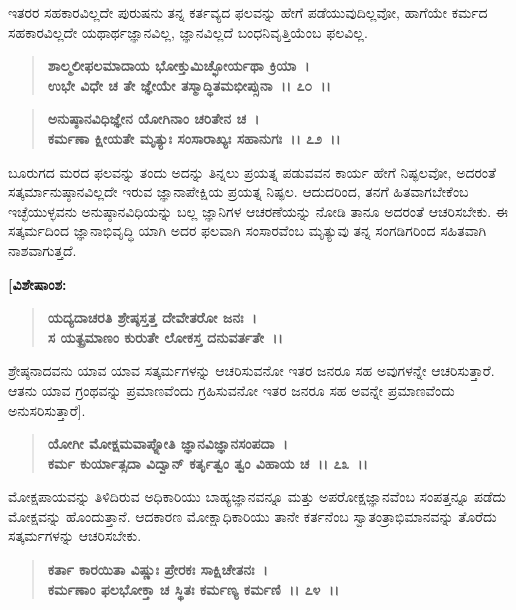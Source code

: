 ಇತರರ ಸಹಕಾರವಿಲ್ಲದೇ ಪುರುಷನು ತನ್ನ ಕರ್ತವ್ಯದ ಫಲವನ್ನು ಹೇಗೆ ಪಡೆಯುವುದಿಲ್ಲವೋ, ಹಾಗೆಯೇ ಕರ್ಮದ ಸಹಕಾರವಿಲ್ಲದೇ ಯಥಾರ್ಥಜ್ಞಾನವಿಲ್ಲ, ಜ್ಞಾನವಿಲ್ಲದೆ ಬಂಧನಿವೃತ್ತಿಯೆಂಬ ಫಲವಿಲ್ಲ.

\begin{verse}
\textbf{ಶಾಲ್ಮಲೀಫಲಮಾದಾಯ ಭೋಕ್ತುಮಿಚ್ಛೋರ್ಯಥಾ ಕ್ರಿಯಾ~।}\\\textbf{ಉಭೇ ವಿಧೇ ಚ ತೇ ಜ್ಞೇಯೇ ತಸ್ಮಾದ್ಧಿತಮಭೀಪ್ಸುನಾ~।। ೭೦~।। }
\end{verse}

\begin{verse}
\textbf{ಅನುಷ್ಠಾನವಿಧಿಜ್ಞೇನ ಯೋಗಿನಾಂ ಚರಿತೇನ ಚ~।}\\\textbf{ಕರ್ಮಣಾ ಕ್ಷೀಯತೇ ಮೃತ್ಯುಃ ಸಂಸಾರಾಖ್ಯಃ ಸಹಾನುಗಃ~।। ೭೨~।।}
\end{verse}

ಬೂರುಗದ ಮರದ ಫಲವನ್ನು ತಂದು ಅದನ್ನು ತಿನ್ನಲು ಪ್ರಯತ್ನ ಪಡುವವನ ಕಾರ್ಯ ಹೇಗೆ ನಿಷ್ಫಲವೋ, ಅದರಂತೆ ಸತ್ಕರ್ಮಾನುಷ್ಠಾನವಿಲ್ಲದೇ ಇರುವ ಜ್ಞಾನಾಪೇಕ್ಷಿಯ ಪ್ರಯತ್ನ ನಿಷ್ಫಲ. ಆದುದರಿಂದ, ತನಗೆ ಹಿತವಾಗಬೇಕೆಂಬ ಇಚ್ಛೆಯುಳ್ಳವನು ಅನುಷ್ಠಾನವಿಧಿಯನ್ನು ಬಲ್ಲ ಜ್ಞಾನಿಗಳ ಆಚರಣೆಯನ್ನು ನೋಡಿ ತಾನೂ ಅದರಂತೆ ಆಚರಿಸಬೇಕು. ಈ ಸತ್ಕರ್ಮದಿಂದ ಜ್ಞಾನಾಭಿವೃದ್ಧಿ ಯಾಗಿ ಅದರ ಫಲವಾಗಿ ಸಂಸಾರವೆಂಬ ಮೃತ್ಯುವು ತನ್ನ ಸಂಗಡಿಗರಿಂದ ಸಹಿತವಾಗಿ ನಾಶವಾಗುತ್ತದೆ.

\textbf{[ವಿಶೇಷಾಂಶ:}

\begin{verse}
\textbf{ಯದ್ಯದಾಚರತಿ ಶ್ರೇಷ್ಠಸ್ತತ್ತ ದೇವೇತರೋ ಜನಃ~।}\\\textbf{ಸ ಯತ್ಪ್ರಮಾಣಂ ಕುರುತೇ ಲೋಕಸ್ತ ದನುವರ್ತತೇ~।।} 
\end{verse}

ಶ್ರೇಷ್ಠನಾದವನು ಯಾವ ಯಾವ ಸತ್ಕರ್ಮಗಳನ್ನು ಆಚರಿಸುವನೋ ಇತರ ಜನರೂ ಸಹ ಅವುಗಳನ್ನೇ ಆಚರಿಸುತ್ತಾರೆ. ಆತನು ಯಾವ ಗ್ರಂಥವನ್ನು ಪ್ರಮಾಣವೆಂದು ಗ್ರಹಿಸುವನೋ ಇತರ ಜನರೂ ಸಹ ಅವನ್ನೇ ಪ್ರಮಾಣವೆಂದು ಅನುಸರಿಸುತ್ತಾರೆ].

\begin{verse}
\textbf{ಯೋಗೀ ಮೋಕ್ಷಮವಾಪ್ನೋತಿ ಜ್ಞಾನವಿಜ್ಞಾನಸಂಪದಾ~।}\\\textbf{ಕರ್ಮ ಕುರ್ಯಾತ್ಸದಾ ವಿದ್ವಾನ್ ಕರ್ತೃತ್ವಂ ತ್ವಂ ವಿಹಾಯ ಚ~।। ೭೩~।।}
\end{verse}

ಮೋಕ್ಷಪಾಯವನ್ನು ತಿಳಿದಿರುವ ಅಧಿಕಾರಿಯು ಬಾಹ್ಯಜ್ಞಾನವನ್ನೂ ಮತ್ತು ಅಪರೋಕ್ಷ\-ಜ್ಞಾನವೆಂಬ ಸಂಪತ್ತನ್ನೂ ಪಡೆದು ಮೋಕ್ಷವನ್ನು ಹೊಂದುತ್ತಾನೆ. ಆದಕಾರಣ ಮೋಕ್ಷಾಧಿಕಾರಿಯು ತಾನೇ ಕರ್ತನೆಂಬ ಸ್ವಾತಂತ್ರಾಭಿಮಾನವನ್ನು ತೊರೆದು ಸತ್ಕರ್ಮಗಳನ್ನು ಆಚರಿಸಬೇಕು.

\begin{verse}
\textbf{ಕರ್ತಾ ಕಾರಯಿತಾ ವಿಷ್ಣುಃ ಪ್ರೇರಕಃ ಸಾಕ್ಷಿಚೇತನಃ~।}\\\textbf{ಕರ್ಮಣಾಂ ಫಲಭೋಕ್ತಾ ಚ ಸ್ಥಿತಃ ಕರ್ಮಣ್ಯ ಕರ್ಮಣಿ~।। ೭೪~।।}
\end{verse}

